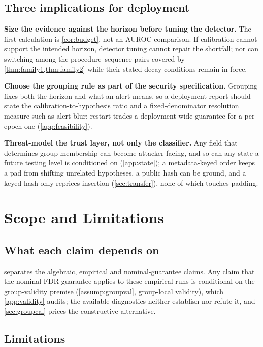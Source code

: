 \documentclass[conference]{IEEEtran}
\newcommand{\FDR}{\mathrm{FDR}}
\begin{document}
\subsection{Three implications for deployment}

\textbf{Size the evidence against the horizon before tuning the detector.} The first calculation is
\cref{cor:budget}, not an AUROC comparison. If calibration cannot support the intended horizon, detector
tuning cannot repair the shortfall; nor can switching among the procedure--sequence pairs covered by
\cref{thm:family1,thm:family2} while their stated decay conditions remain in force.

\textbf{Choose the grouping rule as part of the security specification.} Grouping fixes both the horizon
and what an alert means, so a deployment report should state the calibration-to-hypothesis ratio and a
fixed-denominator resolution measure such as alert blur; restart trades a deployment-wide guarantee for
a per-epoch one (\cref{app:feasibility}).

\textbf{Threat-model the trust layer, not only the classifier.} Any field that determines group
membership can become attacker-facing, and so can any state a future testing level is conditioned on
(\cref{app:state}); a metadata-keyed order keeps a pad from shifting unrelated hypotheses, a public
hash can be ground, and a keyed hash only reprices insertion (\cref{sec:transfer}), none of which touches
padding.

\section{Scope and Limitations}\label{sec:discussion}

\subsection{What each claim depends on}\label{sec:dependency}

 separates the algebraic, empirical and nominal-guarantee claims. Any claim that the
nominal $\FDR$ guarantee applies to these empirical runs is conditional on the group-validity premise
(\cref{assump:groupval}, group-local validity), which \cref{app:validity} audits; the available diagnostics neither
establish nor refute it, and \cref{sec:groupcal} prices the constructive alternative.

\subsection{Limitations}\label{sec:limitations}
\end{document}

